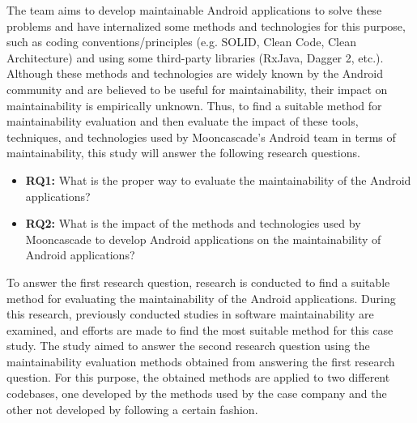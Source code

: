 The team aims to develop maintainable Android applications to solve these problems and have internalized some methods and technologies for this purpose, such as coding conventions/principles (e.g. SOLID, Clean Code, Clean Architecture) and using some third-party libraries (RxJava, Dagger 2, etc.). Although these methods and technologies are widely known by the Android community and are believed to be useful for maintainability, their impact on maintainability is empirically unknown. Thus, to find a suitable method for maintainability evaluation and then evaluate the impact of these tools, techniques, and technologies used by Mooncascade’s Android team in terms of maintainability, this study will answer the following research questions. 

\begin{itemize}
\item \noindent\textbf{RQ1:} What is the proper way to evaluate the maintainability of the Android applications?
\item \noindent\textbf{RQ2:} What is the impact of the methods and technologies used by Mooncascade to develop Android applications on the maintainability of Android applications?
\end{itemize}

To answer the first research question, research is conducted to find a suitable method for evaluating the maintainability of the Android applications. During this research, previously conducted studies in software maintainability are examined, and efforts are made to find the most suitable method for this case study. The study aimed to answer the second research question using the maintainability evaluation methods obtained from answering the first research question. For this purpose, the obtained methods are applied to two different codebases, one developed by the methods used by the case company and the other not developed by following a certain fashion.